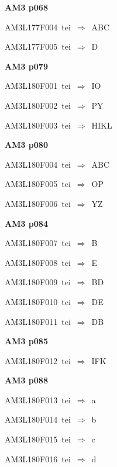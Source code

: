 \par\vfill\eject
{\bf\hfill AM3 p068\hfill\hbox{}}\par\bigskip
{\sixrm AM3L177F004\ {\sixit tei}\ }$\Rightarrow$\ ABC\par\smallskip
{\sixrm AM3L177F005\ {\sixit tei}\ }$\Rightarrow$\ D\par\smallskip

\par\vfill\eject
{\bf\hfill AM3 p079\hfill\hbox{}}\par\bigskip
{\sixrm AM3L180F001\ {\sixit tei}\ }$\Rightarrow$\ IO\par\smallskip
{\sixrm AM3L180F002\ {\sixit tei}\ }$\Rightarrow$\ PY\par\smallskip
{\sixrm AM3L180F003\ {\sixit tei}\ }$\Rightarrow$\ HIKL\par\smallskip

\par\vfill\eject
{\bf\hfill AM3 p080\hfill\hbox{}}\par\bigskip
{\sixrm AM3L180F004\ {\sixit tei}\ }$\Rightarrow$\ ABC\par\smallskip
{\sixrm AM3L180F005\ {\sixit tei}\ }$\Rightarrow$\ OP\par\smallskip
{\sixrm AM3L180F006\ {\sixit tei}\ }$\Rightarrow$\ YZ\par\smallskip

\par\vfill\eject
{\bf\hfill AM3 p084\hfill\hbox{}}\par\bigskip
{\sixrm AM3L180F007\ {\sixit tei}\ }$\Rightarrow$\ B\par\smallskip
{\sixrm AM3L180F008\ {\sixit tei}\ }$\Rightarrow$\ E\par\smallskip
{\sixrm AM3L180F009\ {\sixit tei}\ }$\Rightarrow$\ BD\par\smallskip
{\sixrm AM3L180F010\ {\sixit tei}\ }$\Rightarrow$\ DE\par\smallskip
{\sixrm AM3L180F011\ {\sixit tei}\ }$\Rightarrow$\ DB\par\smallskip

\par\vfill\eject
{\bf\hfill AM3 p085\hfill\hbox{}}\par\bigskip
{\sixrm AM3L180F012\ {\sixit tei}\ }$\Rightarrow$\ IFK\par\smallskip

\par\vfill\eject
{\bf\hfill AM3 p088\hfill\hbox{}}\par\bigskip
{\sixrm AM3L180F013\ {\sixit tei}\ }$\Rightarrow$\ {\tenit a}\par\smallskip
{\sixrm AM3L180F014\ {\sixit tei}\ }$\Rightarrow$\ {\tenit b}\par\smallskip
{\sixrm AM3L180F015\ {\sixit tei}\ }$\Rightarrow$\ {\tenit c}\par\smallskip
{\sixrm AM3L180F016\ {\sixit tei}\ }$\Rightarrow$\ {\tenit d}\par\smallskip

